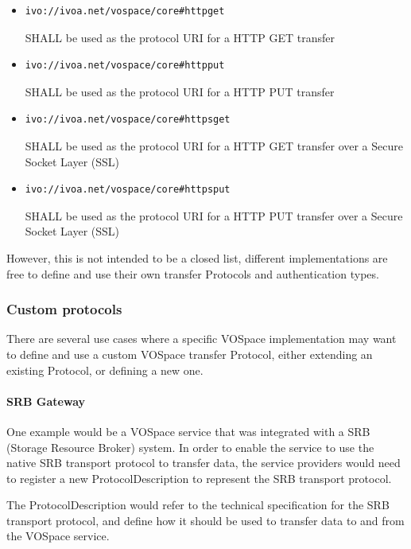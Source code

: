 \documentclass[11pt,a4paper]{ivoa}
\begin{document}
\begin{itemize}
    \item \begin{verbatim}ivo://ivoa.net/vospace/core#httpget\end{verbatim} SHALL be used as the protocol URI for a HTTP GET transfer
    \item \begin{verbatim}ivo://ivoa.net/vospace/core#httpput\end{verbatim} SHALL be used as the protocol URI for a HTTP PUT transfer
    \item \begin{verbatim}ivo://ivoa.net/vospace/core#httpsget\end{verbatim} SHALL be used as the protocol URI for a HTTP GET transfer over a Secure Socket Layer (SSL)
    \item \begin{verbatim}ivo://ivoa.net/vospace/core#httpsput\end{verbatim} SHALL be used as the protocol URI for a HTTP PUT transfer over a Secure Socket Layer (SSL)
\end{itemize}

However, this is not intended to be a closed list, different implementations are free to define and use their own transfer Protocols and authentication types.

\subsubsection{Custom protocols}
\label{subsubsec:custom protocols}
There are several use cases where a specific VOSpace implementation may want to define and use a custom VOSpace transfer Protocol, either extending an existing Protocol, or defining a new one.

\paragraph{SRB Gateway}
One example would be a VOSpace service that was integrated with a SRB (Storage Resource Broker) system. In order to enable the service to use the native SRB transport protocol to transfer data, the service providers would need to register a new ProtocolDescription to represent the SRB transport protocol.

The ProtocolDescription would refer to the technical specification for the SRB transport protocol, and define how it should be used to transfer data to and from the VOSpace service.
\end{document}

